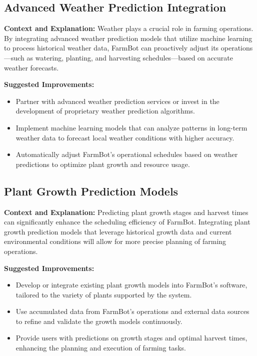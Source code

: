 \subsection{Advanced Weather Prediction Integration}
\textbf{Context and Explanation:} Weather plays a crucial role in farming operations. By integrating advanced weather prediction models that utilize machine learning to process historical weather data, FarmBot can proactively adjust its operations—such as watering, planting, and harvesting schedules—based on accurate weather forecasts.

\textbf{Suggested Improvements:}
\begin{itemize}
    \item Partner with advanced weather prediction services or invest in the development of proprietary weather prediction algorithms.
    \item Implement machine learning models that can analyze patterns in long-term weather data to forecast local weather conditions with higher accuracy.
    \item Automatically adjust FarmBot's operational schedules based on weather predictions to optimize plant growth and resource usage.
\end{itemize}

\subsection{Plant Growth Prediction Models}
\textbf{Context and Explanation:} Predicting plant growth stages and harvest times can significantly enhance the scheduling efficiency of FarmBot. Integrating plant growth prediction models that leverage historical growth data and current environmental conditions will allow for more precise planning of farming operations.

\textbf{Suggested Improvements:}
\begin{itemize}
    \item Develop or integrate existing plant growth models into FarmBot's software, tailored to the variety of plants supported by the system.
    \item Use accumulated data from FarmBot's operations and external data sources to refine and validate the growth models continuously.
    \item Provide users with predictions on growth stages and optimal harvest times, enhancing the planning and execution of farming tasks.
\end{itemize}

